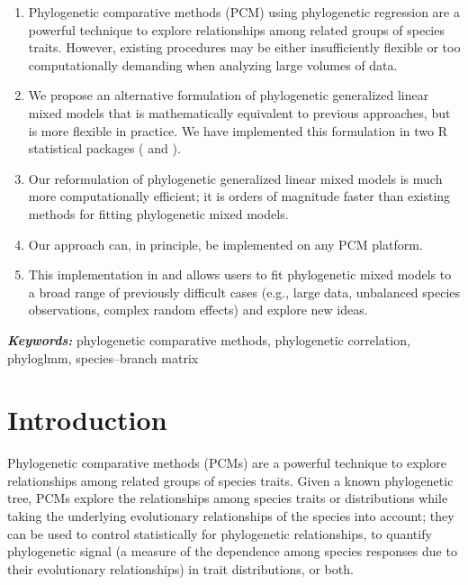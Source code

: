 \documentclass[12pt]{article}
\providecommand{\keywords}[1]{\textbf{\textit{Keywords:}} #1}
\begin{document}
\begin{enumerate}
\item{Phylogenetic comparative methods (PCM) using phylogenetic regression are a powerful technique to explore relationships among related groups of species traits. However, existing procedures may be either insufficiently flexible or too computationally demanding when analyzing large volumes of data.}
\item{We propose an alternative formulation of phylogenetic generalized linear mixed models that is mathematically equivalent to previous approaches, but is more flexible in practice. We have implemented this formulation in two R statistical packages ( and ).}
\item{Our reformulation of phylogenetic generalized linear mixed models is much more computationally efficient; it is orders of magnitude faster than existing methods for fitting phylogenetic mixed models.}
\item{Our approach can, in principle, be implemented on any PCM platform.}
\item{This implementation in  and  allows users to fit phylogenetic mixed models to a broad range of previously difficult cases (e.g., large data, unbalanced species observations, complex random effects) and explore new ideas.}
\end{enumerate}



\keywords{phylogenetic comparative methods, phylogenetic correlation, phyloglmm, species--branch matrix}


\doublespacing

\section*{Introduction}

Phylogenetic comparative methods (PCMs) are a powerful technique to explore relationships among related groups of species traits.
Given a known phylogenetic tree, PCMs explore the relationships among species traits or distributions while taking the underlying evolutionary relationships of the species into account; they can be used to control statistically for phylogenetic relationships, to quantify phylogenetic signal (a measure of the dependence among species responses due to their evolutionary relationships) in trait distributions, or both. 
\end{document}
